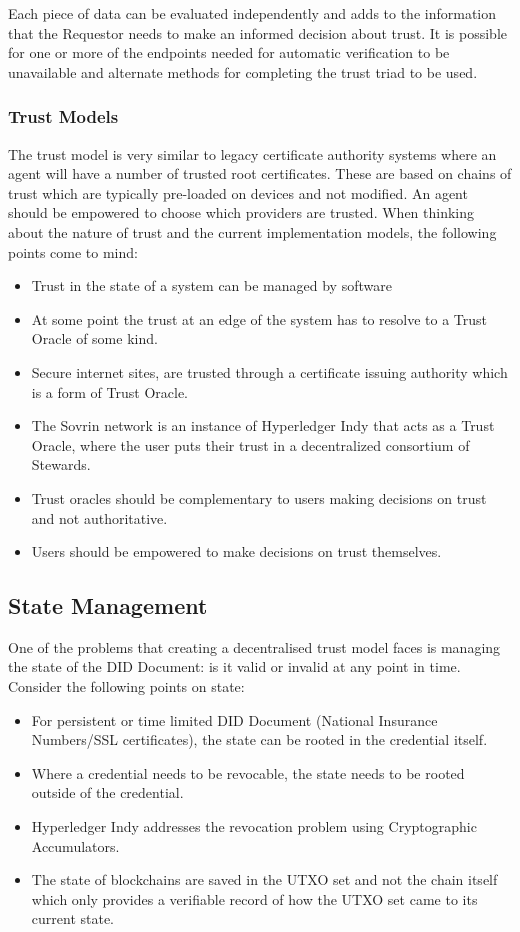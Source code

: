 \documentclass[10pt,a4paper]{runcrypto}
\begin{document}
Each piece of data can be evaluated independently and adds to the information that the Requestor needs to make an informed decision about trust. It is possible for one or more of the endpoints needed for automatic verification to be unavailable and alternate methods for completing the trust triad to be used.

\subsubsection{Trust Models}
The trust model is very similar to legacy certificate authority systems where an agent will have a number of trusted root certificates. These are based on chains of trust which are typically pre-loaded on devices and not modified. An agent should be empowered to choose which providers are trusted.
When thinking about the nature of trust and the current implementation models, the following points come to mind:

\begin{itemize}
	\item Trust in the state of a system can be managed by software
	\item At some point the trust at an edge of the system has to resolve to a Trust Oracle of some kind.
	\item Secure internet sites, are trusted through a certificate issuing authority which is a form of Trust Oracle.
	\item The Sovrin network is an instance of Hyperledger Indy that acts as a Trust Oracle, where the user puts their trust in a decentralized consortium of Stewards.
	\item Trust oracles should be complementary to users making decisions on trust and not authoritative.
	\item Users should be empowered to make decisions on trust themselves.
\end{itemize}

\subsection{State Management}
One of the problems that creating a decentralised trust model faces is managing the state of the DID Document: is it valid or invalid at any point in time. Consider the following points on state:

\begin{itemize}
	\item For persistent or time limited DID Document (National Insurance Numbers/SSL certificates), the state can be rooted in the credential itself.
	\item Where a credential needs to be revocable, the state needs to be rooted outside of the credential.
	\item Hyperledger Indy addresses the revocation problem using Cryptographic Accumulators.
	\item The state of blockchains are saved in the UTXO set and not the chain itself which only provides a verifiable record of how the UTXO set came to its current state.
\end{itemize}
\end{document}
